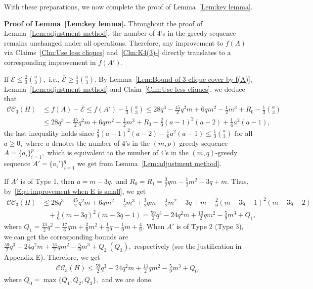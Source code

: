 \documentclass[11pt,a4paper]{article}
\newcommand{\dE}{{\mathcal{E}}}
\newcommand{\coveropt}[2]{{\mathcal{C}\mathcal{C}_{#1}(#2)}}
\begin{document}
With these preparations, we now complete the proof of Lemma~\ref{Lem:key lemma}.
\medskip

\noindent\textbf{Proof of Lemma~\ref{Lem:key lemma}.}
Throughout the proof of Lemma~\ref{Lem:adjustment method}, the number of 4's in the greedy sequence remains unchanged under all operations. 
Therefore, any improvement to $f(A)$ via Claims~\ref{Clm:Use less cliques} and~\ref{Clm:K4(3)-} directly translates to a corresponding improvement in $f(A')$.

If $\dE \leq \frac{2}{3} \binom{a}{3},$ 
i.e., $\overline{\dE}\ge \frac{1}{3} \binom{a}{3}.$
By Lemma~\ref{Lem:Bound of 3-clique cover by f(A)}, Lemma~\ref{Lem:adjustment method} and  Claim~\ref{Clm:Use less cliques},
we deduce that
\begin{align}\label{Equ:improvement when E is small}
\coveropt{3}{H}
&\leq f(A)- \overline{\dE}\leq f(A')-\frac{1}{3}\binom{a}{3}
\leq
28q^3-\frac{45}{2}q^2m+6qm^2-\frac{1}{2}m^3+R_0
-\frac 1 3 \binom{a}{3}\nonumber \\
&\leq 
28q^3-\frac{45}{2}q^2m+6qm^2-\frac{1}{2}m^3+R_0
-\frac{2}{9}(a-1)^2(a-2)+\frac{1}{6}a^2(a-1),
\end{align}
the last inequality holds since 
$\frac{2}{9}(a-1)^2(a-2)-\frac{1}{6}a^2(a-1)\le \frac 1 3 \binom{a}{3}$ for all $a\ge 0,$
where $a$ denotes the number of $4$'s in the $(m,p)$-greedy sequence $A=\{a_i\}_{i=1}^p,$
which is equivalent to the number of $4$'s in the $(m,q)$-greedy sequence $A'=\{a_i'\}_{i=1}^q$ we get from Lemma~\ref{Lem:adjustment method}.

If $A'$ is of Type 1,
then $a=m-3q,$ and $R_0=R_1=\frac{3}{2}qm-\frac{1}{2}m^2-3q+m.$
Thus, by~\eqref{Equ:improvement when E is small}, we get
\begin{align*}
\coveropt{3}{H}
&\leq
28q^3-\frac{45}{2}q^2m+6qm^2-\frac{1}{2}m^3
+\frac{3}{2}qm-\frac{1}{2}m^2-3q+m-\frac{2}{9}(m-3q-1)^2(m-3q-2)\\
&\ \ \ \ +\frac{1}{6}(m-3q)^2(m-3q-1)
=\frac{59} 2 q^3 - 24 q^2 m + \frac{13}{2} q m^2 - \frac{5}{9} m^3
   +Q_1,
\end{align*}
where $Q_1= \frac {13} 2 q^2 -\frac {17} 6 q m + \frac 2 9 m^2 + \frac{1}{3} q - \frac 1 9 m + \frac 4 9.$
When $A'$ is of Type 2 (Type 3), 
we can get the corresponding bounds are $\frac{59} 2 q^3 - 24 q^2 m + \frac{13}{2} q m^2 - \frac{5}{9} m^3+Q_2\ (Q_3),$ respectively (see the justification in Appendix E).
Therefore, we get 
\begin{align}\label{Equ:best bound of CC3(H)}
    \coveropt{3}{H}\le \frac{59} 2 q^3 - 24 q^2 m + \frac{13}{2} q m^2 - \frac{5}{9} m^3+Q_0,
\end{align}
where $Q_0=\max\{Q_1,Q_2,Q_3\},$ and we are done.
\end{document}
